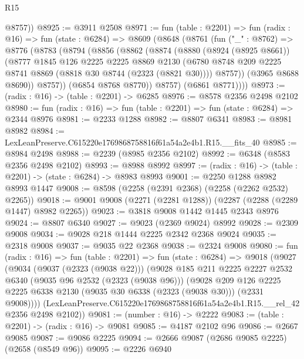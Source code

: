 \begin{lexlean}{R15}
\begin{coremodule}
        @8757))
@8925 := @3911 @2508
@8971 := fun (table : @2201) =>
  fun (radix : @16) =>
  fun (state : @6284) =>
  @8609
    (@8648
      (@8761
        (fun ("_" : @8762) =>
        @8776
          (@8783
            (@8794
              (@8856
                (@8862
                  (@8874
                    (@8880
                      (@8924 (@8925 @8661))
                      (@8777
                        @1845
                        @126
                        @2225
                        @2225
                        @8869
                        @2130
                        (@6780 @8748 @209 @2225 @8741 @8869 (@8818 @30 @8744 (@2323 (@8821 @30))))
                        @8757))
                    (@3965 @8688 @8690))
                  @8757))
              (@6854 @8768 @8770))
            @8757)
          (@6861 @8771))))
@8973 := (radix : @16) -> (table : @2201) -> @6285
@8976 := @8578 @2356 @2498 @2102
@8980 := fun (radix : @16) => fun (table : @2201) => fun (state : @6284) => @2344 @8976
@8981 := @2233 @1288
@8982 := @8807 @6341
@8983 := @8981 @8982
@8984 := LexLeanPreserve.C615220e1769868758816f61a54a2e4b1.R15.__fits_40
@8985 := @8984 @2498
@8988 := @2239 (@8985 @2356 @2102)
@8992 := @6348 (@8583 @2356 @2498 @2102)
@8993 := @8988 @8992
@8997 := (radix : @16) -> (table : @2201) -> (state : @6284) -> @8983 @8993
@9001 := @2250 @1288 @8982 @8993 @1447
@9008 := @8598 (@2258 (@2391 @2368) (@2258 (@2262 @2532) @2265))
@9018 := @9001 @9008 (@2271 (@2281 @1288)) (@2287 (@2288 (@2289 @1447) @8982 @2265))
@9023 := @3818 @9008 @1442 @1445 @2343 @8976
@9024 := @8807 @6340
@9027 := @9023 (@2369 @9024) @8992
@9028 := @2309 @9008
@9034 := @9028 @218 @1444 @2225 @2342 @2368 @9024
@9035 := @2318 @9008
@9037 := @9035 @22 @2368
@9038 := @2324 @9008
@9080 := fun (radix : @16) =>
  fun (table : @2201) =>
  fun (state : @6284) =>
  @9018
    (@9027
      (@9034
        (@9037 (@2323 (@9038 @22)))
        (@9028
          @185
          @211
          @2225
          @2227
          @2532
          @6340
          (@9035 @96 @2532 (@2323 (@9038 @96)))
          (@9028
            @209
            @126
            @2225
            @2225
            @6338
            @2130
            (@9035 @30 @6338 (@2323 (@9038 @30)))
            (@2331 @9008))))
      (LexLeanPreserve.C615220e1769868758816f61a54a2e4b1.R15.__rel_42 @2356 @2498 @2102))
@9081 := (number : @16) -> @2222
@9083 := (table : @2201) -> (radix : @16) -> @9081
@9085 := @4187 @2102 @96
@9086 := @2667 @9085
@9087 := @9086 @2225
@9094 := @2666 @9087 (@2686 @9085 @2225) (@2658 (@8549 @96))
@9095 := @2226 @6940

\end{coremodule}
\end{lexlean}
